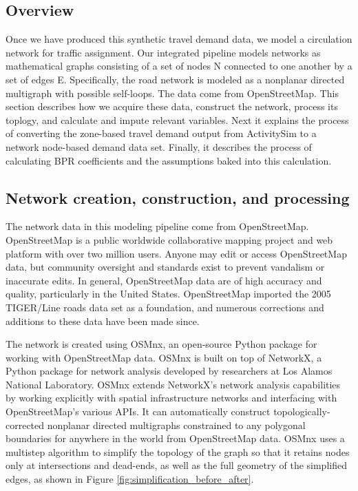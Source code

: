 \subsection{Overview}

Once we have produced this synthetic travel demand data, we model a circulation network for traffic assignment. Our integrated pipeline models networks as mathematical graphs consisting of a set of nodes N connected to one another by a set of edges E. Specifically, the road network is modeled as a nonplanar directed multigraph with possible self-loops. The data come from OpenStreetMap. This section describes how we acquire these data, construct the network, process its toplogy, and calculate and impute relevant variables. Next it explains the process of converting the zone-based travel demand output from ActivitySim to a network node-based demand data set. Finally, it describes the process of calculating BPR coefficients and the assumptions baked into this calculation.

\subsection{Network creation, construction, and processing}

The network data in this modeling pipeline come from OpenStreetMap. OpenStreetMap is a public worldwide collaborative mapping project and web platform with over two million users. Anyone may edit or access OpenStreetMap data, but community oversight and standards exist to prevent vandalism or inaccurate edits. In general, OpenStreetMap data are of high accuracy and quality, particularly in the United States. OpenStreetMap imported the 2005 TIGER/Line roads data set as a foundation, and numerous corrections and additions to these data have been made since.

The network is created using OSMnx, an open-source Python package for working with OpenStreetMap data. OSMnx is built on top of NetworkX, a Python package for network analysis developed by researchers at Los Alamos National Laboratory. OSMnx extends NetworkX's network analysis capabilities by working explicitly with spatial infrastructure networks and interfacing with OpenStreetMap's various APIs. It can automatically construct topologically-corrected nonplanar directed multigraphs constrained to any polygonal boundaries for anywhere in the world from OpenStreetMap data. OSMnx uses a multistep algorithm to simplify the topology of the graph so that it retains nodes only at intersections and dead-ends, as well as the full geometry of the simplified edges, as shown in Figure \ref{fig:simplification_before_after}.

